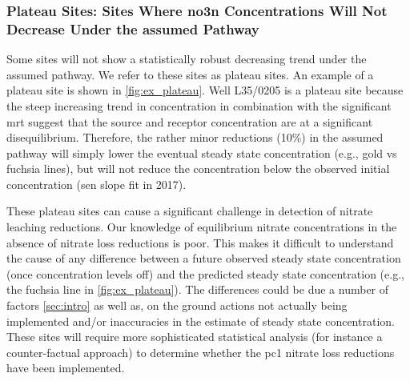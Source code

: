 \subsubsection[Plateau Sites]{Plateau Sites: Sites Where \gls{no3n} Concentrations Will Not Decrease Under the assumed Pathway} \label{sec:plateau_results}



Some sites will not show a statistically robust decreasing trend under the assumed pathway.
We refer to these sites as plateau sites. An example of a plateau site is shown in \autoref{fig:ex_plateau}.
Well L35/0205 is a plateau site because the steep increasing trend in concentration in combination with the significant \gls{mrt} suggest that the source and receptor concentration are at a significant disequilibrium.
Therefore, the rather minor reductions (10\%) in the assumed pathway will simply lower the eventual steady state concentration (e.g., gold vs fuchsia lines), but will not reduce the concentration below the observed initial concentration (sen slope fit in 2017).


These plateau sites can cause a significant challenge in detection of nitrate leaching reductions.
Our knowledge of equilibrium nitrate concentrations in the absence of nitrate loss reductions is poor.
This makes it difficult to understand the cause of any difference between a future observed steady state concentration (once concentration levels off) and the predicted steady state concentration (e.g., the fuchsia line in \autoref{fig:ex_plateau}).
The differences could be due a number of factors \autoref{sec:intro} as well as, on the ground actions not actually being implemented and/or inaccuracies in the estimate of steady state concentration.
These sites will require more sophisticated statistical analysis (for instance a counter-factual approach) to determine whether the \gls{pc1} nitrate loss reductions have been implemented.

